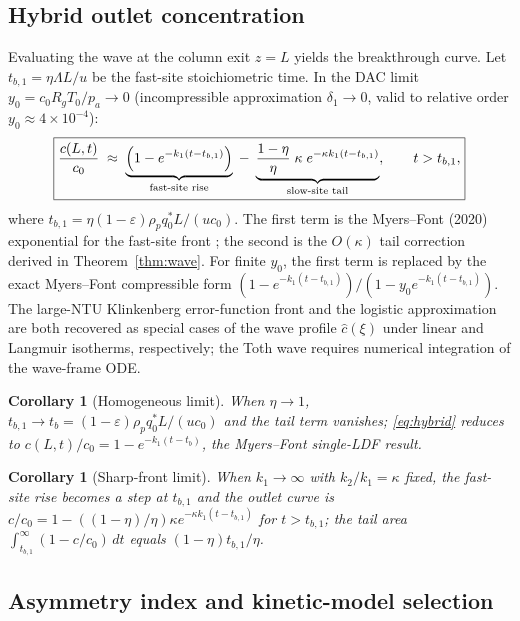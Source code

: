\documentclass[a4paper]{amsart}
\newtheorem{corollary}[theorem]{Corollary}
\theoremstyle{definition}
\begin{document}
\subsection{Hybrid outlet concentration}

Evaluating the wave at the column exit $z=L$ yields the breakthrough curve.
Let $t_{b,1}=\eta\Lambda L/u$ be the fast-site stoichiometric time.
In the DAC limit $y_0=c_0R_gT_0/p_a\to0$ (incompressible approximation
$\delta_1\to0$, valid to relative order $y_0\approx4\times10^{-4}$):
\begin{equation}
  \boxed{
  \frac{c(L,t)}{c_0}
  \;\approx\;
  \underbrace{\Bigl(1-e^{-k_1(t-t_{b,1})}\Bigr)}_{\text{fast-site rise}}
  \;-\;
  \underbrace{\frac{1-\eta}{\eta}\;\kappa\;e^{-\kappa k_1(t-t_{b,1})}}_{\text{slow-site tail}},
  \qquad t>t_{b,1},}
  \label{eq:hybrid}
\end{equation}
where $t_{b,1}=\eta(1-\varepsilon)\rho_p q_0^* L/(uc_0)$.
The first term is the Myers--Font (2020) exponential for the fast-site front
\cite{MyersFont2020}; the second is the $O(\kappa)$ tail correction derived in
Theorem~\ref{thm:wave}.  For finite $y_0$, the first term is replaced by the
exact Myers--Font compressible form
$(1-e^{-k_1(t-t_{b,1})})/(1-y_0 e^{-k_1(t-t_{b,1})})$.
The large-NTU Klinkenberg error-function front and the logistic approximation
are both recovered as special cases of the wave profile $\hat{c}(\xi)$ under
linear and Langmuir isotherms, respectively; the Toth wave requires numerical
integration of the wave-frame ODE.

\begin{corollary}[Homogeneous limit]\label{cor:hom}
When $\eta\to1$, $t_{b,1}\to t_b=(1-\varepsilon)\rho_p q_0^* L/(uc_0)$
and the tail term vanishes; \eqref{eq:hybrid} reduces to
$c(L,t)/c_0 = 1-e^{-k_1(t-t_b)}$, the Myers--Font single-LDF result.
\end{corollary}

\begin{corollary}[Sharp-front limit]\label{cor:sharp}
When $k_1\to\infty$ with $k_2/k_1=\kappa$ fixed, the fast-site rise
becomes a step at $t_{b,1}$ and the outlet curve is
$c/c_0 = 1 - ((1-\eta)/\eta)\kappa e^{-\kappa k_1(t-t_{b,1})}$
for $t>t_{b,1}$; the tail area $\int_{t_{b,1}}^\infty(1-c/c_0)\,dt$
equals $(1-\eta)t_{b,1}/\eta$.
\end{corollary}

\subsection{Asymmetry index and kinetic-model selection}
\end{document}
